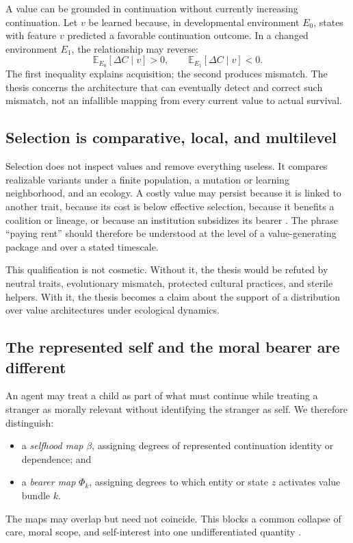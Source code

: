 \documentclass[11pt]{article}
\newcommand{\E}{\mathbb{E}}
\begin{document}
A value can be grounded in continuation without currently increasing continuation. Let $v$ be learned because, in developmental environment $E_0$, states with feature $v$ predicted a favorable continuation outcome. In a changed environment $E_1$, the relationship may reverse:
\begin{equation}
\E_{E_0}[\Delta C\mid v]>0,
\qquad
\E_{E_1}[\Delta C\mid v]<0.
\end{equation}
The first inequality explains acquisition; the second produces mismatch. The thesis concerns the architecture that can eventually detect and correct such mismatch, not an infallible mapping from every current value to actual survival.

\subsection{Selection is comparative, local, and multilevel}

Selection does not inspect values and remove everything useless. It compares realizable variants under a finite population, a mutation or learning neighborhood, and an ecology. A costly value may persist because it is linked to another trait, because its cost is below effective selection, because it benefits a coalition or lineage, or because an institution subsidizes its bearer \citep{zarncke2026vbd}. The phrase ``paying rent'' should therefore be understood at the level of a value-generating package and over a stated timescale.

This qualification is not cosmetic. Without it, the thesis would be refuted by neutral traits, evolutionary mismatch, protected cultural practices, and sterile helpers. With it, the thesis becomes a claim about the support of a distribution over value architectures under ecological dynamics.

\subsection{The represented self and the moral bearer are different}

An agent may treat a child as part of what must continue while treating a stranger as morally relevant without identifying the stranger as self. We therefore distinguish:
\begin{itemize}
\item a \emph{selfhood map} $\beta$, assigning degrees of represented continuation identity or dependence; and
\item a \emph{bearer map} $\Phi_k$, assigning degrees to which entity or state $z$ activates value bundle $k$.
\end{itemize}
The maps may overlap but need not coincide. This blocks a common collapse of care, moral scope, and self-interest into one undifferentiated quantity \citep{zarncke2026uoc}.
\end{document}
